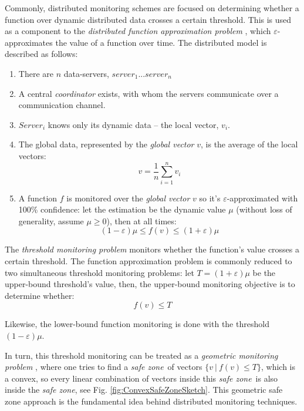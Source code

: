 \documentclass[11pt, conference]{article}
\newcommand{\safeZone}{\textit{safe zone}}
\begin{document}
Commonly, distributed monitoring schemes are focused on determining whether a function over dynamic distributed data crosses a certain threshold. This is used as a component to the \textit{distributed function approximation problem} \cite{garofalakis2013sketch}, which $\varepsilon$-approximates the value of a function over time. The distributed model is described as follows:
\begin{enumerate}
\item There are $n$ data-servers, $server_1 ... server_n$
\item A central \textit{coordinator} exists, with whom the servers communicate over a communication channel.
\item $Server_i$ knows only its dynamic data -- the local vector, $v_i$.
\item The global data, represented by the \textit{global vector} $v$, is the average of the local vectors:
\begin{equation}
v = \frac{1}{n}\sum\limits_{i=1}^n {v_i}
\end{equation}
\item A function $f$ is monitored over the \textit{global vector} $v$ so it's $\varepsilon$-approximated with 100\% confidence: let the estimation be the dynamic value $\mu$ (without loss of generality, assume ${\mu \geq 0}$), then at all times: 
\begin{equation}
(1-\varepsilon )\mu \leq f(v) \leq (1+\varepsilon )\mu
\end{equation}
\end{enumerate}

The \textit{threshold monitoring problem} \cite{garofalakis2013sketch}  monitors whether the function's value crosses a certain threshold. The function approximation problem is commonly reduced to two simultaneous threshold monitoring problems: let ${T = (1+\varepsilon )\mu}$ be the upper-bound threshold's value, then, the upper-bound monitoring objective is to determine whether:
\begin{equation}
f(v) \leq T
\end{equation}

Likewise, the lower-bound function monitoring is done with the threshold ${(1-\varepsilon )\mu}$.

In turn, this threshold monitoring can be treated as a \textit{geometric monitoring problem} \cite{sharfman2007geometric}, where one tries to find a \safeZone \ of vectors ${\{v \ | \ f(v) \leq T\}}$, which is a convex, so every linear combination of vectors inside this \safeZone \ is also inside the \safeZone , see Fig. \ref{fig:ConvexSafeZoneSketch}. This geometric safe zone approach is the fundamental idea behind distributed monitoring techniques.
\end{document}

